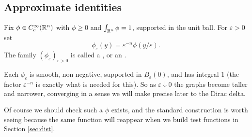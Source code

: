 \documentclass[a4paper]{scrartcl}
\begin{document}
\subsection{Approximate identities}

\begin{definition}[Mollifier]
	Fix $\phi \in C_c^\infty(\mathbb{R}^n)$ with $\phi \ge 0$ and $\int_{\mathbb{R}^n} \phi = 1$, supported in the unit ball. For $\varepsilon > 0$ set
	$$\phi_\varepsilon(y) = \varepsilon^{-n} \phi(y/\varepsilon).$$
	The family $(\phi_\varepsilon)_{\varepsilon>0}$ is called a , or an .
\end{definition}

Each $\phi_\varepsilon$ is smooth, non-negative, supported in $B_\varepsilon(0)$, and has integral $1$ (the factor $\varepsilon^{-n}$ is exactly what is needed for this). So as $\varepsilon \downarrow 0$ the graphs become taller and narrower, converging in a sense we will make precise later to the Dirac delta.

Of course we should check such a $\phi$ exists, and the standard construction is worth seeing because the same function will reappear when we build test functions in Section \ref{sec:dist}.
\end{document}
